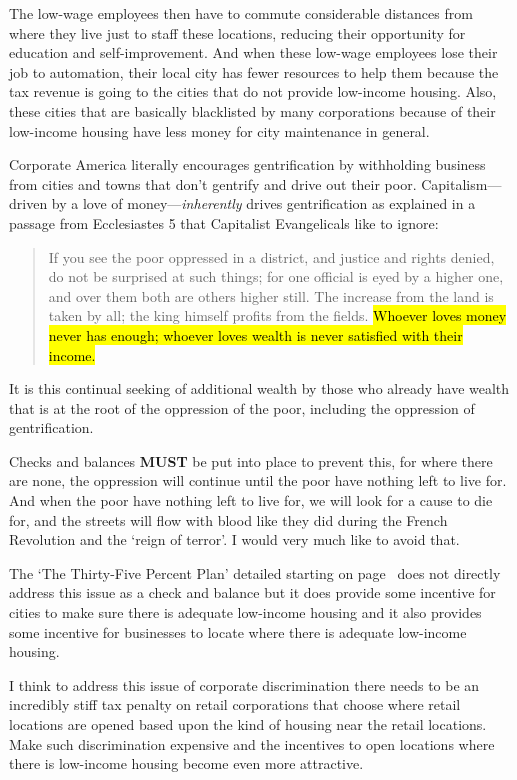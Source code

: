 The low-wage employees then have to commute considerable distances from where they live just to staff these locations, reducing their opportunity for education and self-improvement. And when these low-wage employees lose their job to automation, their local city has fewer resources to help them because the tax revenue is going to the cities that do not provide low-income housing. Also, these cities that are basically blacklisted by many corporations because of their low-income housing have less money for city maintenance in general.

Corporate America literally encourages gentrification by withholding business from cities and towns that don't gentrify and drive out their poor. Capitalism---driven by a love of money---\emph{inherently} drives gentrification as explained in a passage from Ecclesiastes 5 that Capitalist Evangelicals like to ignore:

\begin{quote}
If you see the poor oppressed in a district, and justice and rights denied, do not be surprised at such things; for one official is eyed by a higher one, and over them both are others higher still. The increase from the land is taken by all; the king himself profits from the fields. \hl{Whoever loves money never has enough; whoever loves wealth is never satisfied with their income.}
\end{quote}

It is this continual seeking of additional wealth by those who already have wealth that is at the root of the oppression of the poor, including the oppression of gentrification.

Checks and balances \textbf{MUST} be put into place to prevent this, for where there are none, the oppression will continue until the poor have nothing left to live for. And when the poor have nothing left to live for, we will look for a cause to die for, and the streets will flow with blood like they did during the French Revolution and the `reign of terror'. I would very much like to avoid that.

The `The Thirty-Five Percent Plan' detailed starting on page~\pageref{thirtyfive} does not directly address this issue as a check and balance but it does provide some incentive for cities to make sure there is adequate low-income housing and it also provides some incentive for businesses to locate where there is adequate low-income housing.

I think to address this issue of corporate discrimination there needs to be an incredibly stiff tax penalty on retail corporations that choose where retail locations are opened based upon the kind of housing near the retail locations. Make such discrimination expensive and the incentives to open locations where there is low-income housing become even more attractive.

